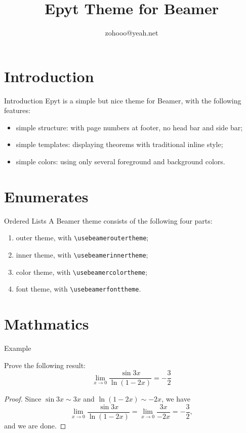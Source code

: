 \documentclass[14pt]{beamer}
\title{Epyt Theme for Beamer}
\author{zohooo@yeah.net}
\begin{document}
\begin{frame}[plain]\transboxout
\titlepage
\end{frame}

\begin{frame}\transboxin
\begin{center}
\tableofcontents[hideallsubsections]
\end{center}
\end{frame}


\section{Introduction}

\begin{frame}{Introduction}
Epyt is a simple but nice theme for Beamer, with the following features: \pause
\begin{itemize}[<+->]
\item simple structure: with page numbers at footer, no head bar and side bar;
\item simple templates: displaying theorems with traditional inline style;
\item simple colors: using only several foreground and background colors.
\end{itemize}
\end{frame}


\section{Enumerates}

\begin{frame}[fragile]{Ordered Lists}
A Beamer theme consists of the following four parts: \pause
\begin{enumerate}[<+->]
\item outer theme, with \verb!\usebeameroutertheme!;
\item inner theme, with \verb!\usebeamerinnertheme!;
\item color theme, with \verb!\usebeamercolortheme!;
\item font theme, with \verb!\usebeamerfonttheme!.
\end{enumerate}
\end{frame}


\section{Mathmatics}

\begin{frame}{Example}
\begin{example}
Prove the following result:
\[ \lim_{x\to0}\frac{\sin 3x}{\ln(1-2x)}=-\frac{3}{2} \]
\end{example}\pause
\begin{proof}
Since $\sin 3x \sim 3x$ and $\ln(1-2x) \sim -2x$, we have
\[ \lim_{x\to0}\frac{\sin 3x}{\ln(1-2x)}=\lim_{x\to0}\frac{3x}{-2x}=-\frac{3}{2}, \]
and we are done.
\end{proof}
\end{frame}
\end{document}
